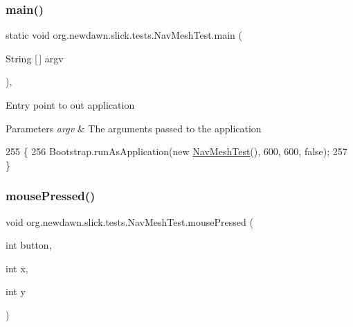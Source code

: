 \subsubsection{\texorpdfstring{main()}{main()}}
{\footnotesize\ttfamily static void org.\+newdawn.\+slick.\+tests.\+Nav\+Mesh\+Test.\+main (\begin{DoxyParamCaption}\item[{String \mbox{[}$\,$\mbox{]}}]{argv }\end{DoxyParamCaption})\hspace{0.3cm}{\ttfamily [inline]}, {\ttfamily [static]}}

Entry point to out application


\begin{DoxyParams}{Parameters}
{\em argv} & The arguments passed to the application \\
\hline
\end{DoxyParams}

\begin{DoxyCode}
255                                            \{
256         Bootstrap.runAsApplication(\textcolor{keyword}{new} \mbox{\hyperlink{classorg_1_1newdawn_1_1slick_1_1tests_1_1_nav_mesh_test_a55eff0f99dac7ecd6af36752d1702ca7}{NavMeshTest}}(), 600, 600, \textcolor{keyword}{false});
257     \}
\end{DoxyCode}
\mbox{\label{classorg_1_1newdawn_1_1slick_1_1tests_1_1_nav_mesh_test_ab74b2ac83a83fa278dbfc76a9563b921}} 
\subsubsection{\texorpdfstring{mouse\+Pressed()}{mousePressed()}}
{\footnotesize\ttfamily void org.\+newdawn.\+slick.\+tests.\+Nav\+Mesh\+Test.\+mouse\+Pressed (\begin{DoxyParamCaption}\item[{int}]{button,  }\item[{int}]{x,  }\item[{int}]{y }\end{DoxyParamCaption})\hspace{0.3cm}{\ttfamily [inline]}}

